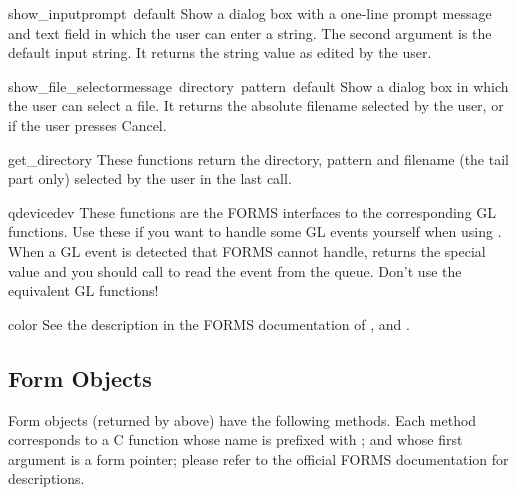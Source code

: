 \begin{funcdesc}{show_input}{prompt\, default}
Show a dialog box with a one-line prompt message and text field in
which the user can enter a string.  The second argument is the default
input string.  It returns the string value as edited by the user.
\end{funcdesc}

\begin{funcdesc}{show_file_selector}{message\, directory\, pattern\, default}
Show a dialog box in which the user can select a file.  It returns
the absolute filename selected by the user, or  if the user
presses Cancel.
\end{funcdesc}

\begin{funcdesc}{get_directory}{}
These functions return the directory, pattern and filename (the tail
part only) selected by the user in the last 
call.
\end{funcdesc}

\begin{funcdesc}{qdevice}{dev}
These functions are the FORMS interfaces to the corresponding GL
functions.  Use these if you want to handle some GL events yourself
when using .  When a GL event is detected that
FORMS cannot handle,  returns the special value
 and you should call  to read the
event from the queue.  Don't use the equivalent GL functions!
\end{funcdesc}

\begin{funcdesc}{color}{}
See the description in the FORMS documentation of ,
 and .
\end{funcdesc}

\subsection{Form Objects}

Form objects (returned by  above) have the
following methods.  Each method corresponds to a C function whose name
is prefixed with ; and whose first argument is a form
pointer; please refer to the official FORMS documentation for
descriptions.

